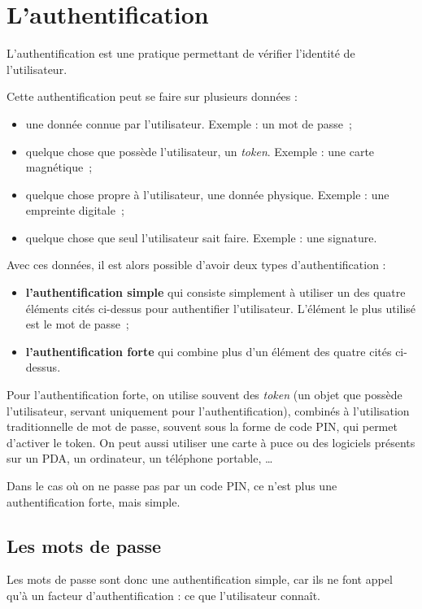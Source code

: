 \section{L'authentification\label{sec:Authentification}}
L'authentification est une pratique permettant de vérifier
l'identité de l'utilisateur.

Cette authentification peut se faire sur plusieurs données : 
\begin{itemize}
  \item une donnée connue par l'utilisateur. Exemple : un mot de
passe~;
  \item quelque chose que possède l'utilisateur, un \emph{token}.
Exemple : une carte magnétique~;
  \item quelque chose propre à l'utilisateur, une donnée physique.
Exemple : une empreinte digitale~;
  \item quelque chose que seul l'utilisateur sait faire. Exemple :
une signature.
\\
\end{itemize}

Avec ces données, il est alors possible d'avoir deux types
d'authentification : 
\begin{itemize}
  \item {\sffamily\textbf{l'authentification simple}} qui consiste simplement à
utiliser un des quatre éléments cités ci-dessus pour authentifier
l'utilisateur. L'élément le plus utilisé est le mot de passe~;
  \item {\sffamily\textbf{l'authentification forte}} qui combine plus d'un élément
des quatre cités ci-dessus.
\\
\end{itemize}

Pour l'authentification forte, on utilise souvent des
\emph{token} (un objet que possède l'utilisateur, servant
uniquement pour l'authentification), 
combinés à l'utilisation traditionnelle de mot de passe, souvent
sous la forme de code PIN, qui permet d'activer le token.
On peut aussi utiliser une carte à puce ou des logiciels présents
sur un PDA, un ordinateur, un téléphone portable, …

Dans le cas où on ne passe pas par un code PIN, ce n'est plus une
authentification forte, mais simple.

\subsection{Les mots de passe}
Les mots de passe sont donc une authentification simple, car ils
ne font appel qu'à un facteur d'authentification : ce que
l'utilisateur connaît. 

